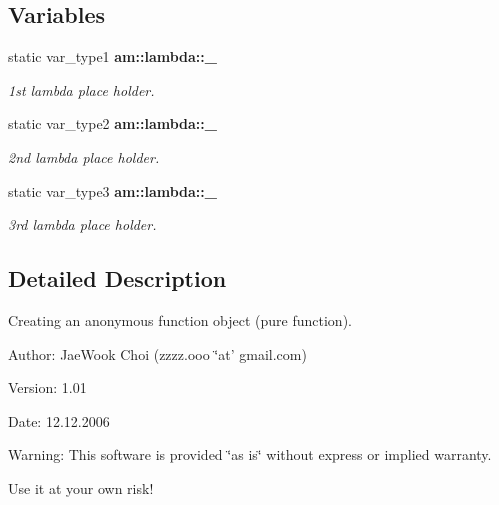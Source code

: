 \subsection*{Variables}
\begin{CompactItemize}
\item 
static var\_\-type1 {\bf am::lambda::\_}\label{namespaceam_1_1lambda_46cdab44274e0a15a02179cade2f0bb4}

\begin{CompactList}\small\item\em 1st lambda place holder. \item\end{CompactList}\item 
static var\_\-type2 {\bf am::lambda::\_}\label{namespaceam_1_1lambda_be9e932c0d9cdc2f591c5909be5540f3}

\begin{CompactList}\small\item\em 2nd lambda place holder. \item\end{CompactList}\item 
static var\_\-type3 {\bf am::lambda::\_}\label{namespaceam_1_1lambda_1d4c5fedf2e7cdfc66c96e25990a39a6}

\begin{CompactList}\small\item\em 3rd lambda place holder. \item\end{CompactList}\end{CompactItemize}


\subsection{Detailed Description}
Creating an anonymous function object (pure function). 

\begin{Desc}
\item[Author:]Jae\-Wook Choi (zzzz.ooo \char`\"{}at' gmail.com) \end{Desc}
\begin{Desc}
\item[Version:]1.01 \end{Desc}
\begin{Desc}
\item[Date:]12.12.2006 \end{Desc}
\begin{Desc}
\item[Warning:]This software is provided \char`\"{}as is\char`\"{} without express or implied warranty. 

Use it at your own risk! \end{Desc}


